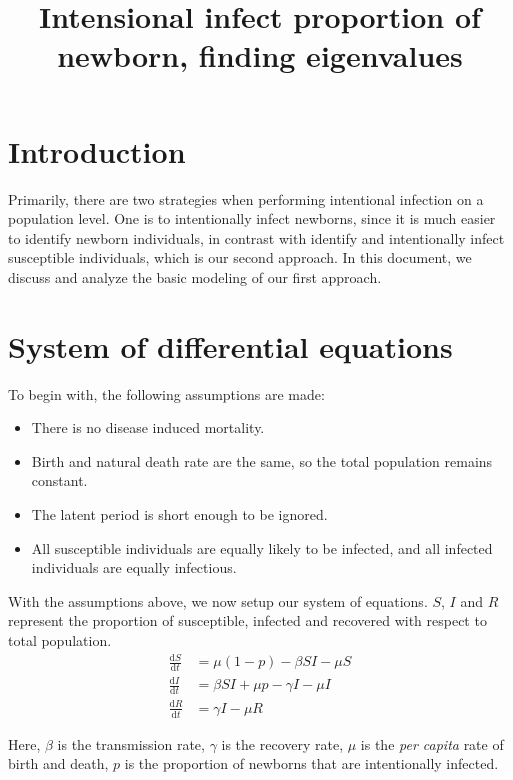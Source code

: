 \documentclass[12pt]{article}
\title{Intensional infect proportion of newborn, finding eigenvalues}
\newcommand\dbyd[2]{\frac{\mathrm d{#1}}{\mathrm d{#2}}}
\begin{document}
\linenumbers

\maketitle

\section{Introduction}

Primarily, there are two strategies when performing intentional infection on a population level. One is to intentionally infect newborns, since it is much easier to identify newborn individuals, in contrast with identify and intentionally infect susceptible individuals, which is our second approach. In this document, we discuss and analyze the basic modeling of our first approach.

\section{System of differential equations}
To begin with, the following assumptions are made:
\begin{itemize}
\item There is no disease induced mortality.
\item Birth and natural death rate are the same, so the total population remains constant.
\item The latent period is short enough to be ignored.
\item All susceptible individuals are equally likely to be infected, and all infected individuals are equally infectious.
\end{itemize}

With the assumptions above, we now setup our system of equations.
$S$, $I$ and $R$ represent the proportion of susceptible, infected and recovered with respect to total population.
\begin{equation}\label{1}
\begin{split}
\dbyd{S}{t}&=\mu(1-p)- \beta SI-\mu S \\
\dbyd{I}{t}&=\beta SI+\mu p-\gamma I -\mu I\\
\dbyd{R}{t}&=\gamma I-\mu R
\end{split}
\end{equation}

Here, $\beta$ is the transmission rate, $\gamma$ is the recovery rate,
$\mu$ is the \emph{per capita} rate of birth and death, $p$ is the
proportion of newborns that are intentionally infected.
\end{document}
